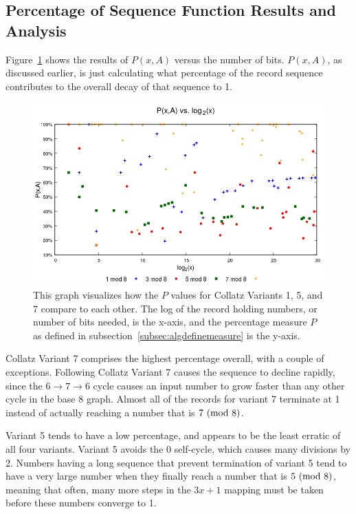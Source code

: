 \subsection{Percentage of Sequence Function Results and Analysis} \label{subsubsec:algsinpercentage}
 Figure~\ref{fig:pvslog} shows the results of $P(x,A)$ versus the number of bits. $P(x,A)$, as discussed earlier, is just calculating what percentage of the record sequence contributes to the overall decay of that sequence to 1. \par
\begin{figure}
    \centering
    \includegraphics[scale=0.6]{ModAvoidanceAnalysisPics/P_vs_log.png}
    \caption{This graph visualizes how the $P$ values for Collatz Variants 1, 5, and 7 compare to each other. The log of the record holding numbers, or number of bits needed, is the x-axis, and the percentage measure $P$ as defined in subsection~\ref{subsec:algdefinemeasure} is the y-axis.}
    \label{fig:pvslog}
\end{figure}
Collatz Variant 7 comprises the highest percentage overall, with a couple of exceptions. Following Collatz Variant 7 causes the sequence to decline rapidly, since the $6 \rightarrow 7 \rightarrow 6$ cycle causes an input number to grow faster than any other cycle in the base 8 graph. Almost all of the records for variant 7 terminate at 1 instead of actually reaching a number that is $7 \ (\mathrm{mod}\ 8)$. \par
Variant 5 tends to have a low percentage, and appears to be the least erratic of all four variants. Variant 5 avoids the 0 self-cycle, which causes many divisions by 2. Numbers having a long sequence that prevent termination of variant 5 tend to have a very large number when they finally reach a number that is $5 \ (\mathrm{mod}\ 8)$, meaning that often, many more steps in the $3x+1$ mapping must be taken before these numbers converge to 1. \par
